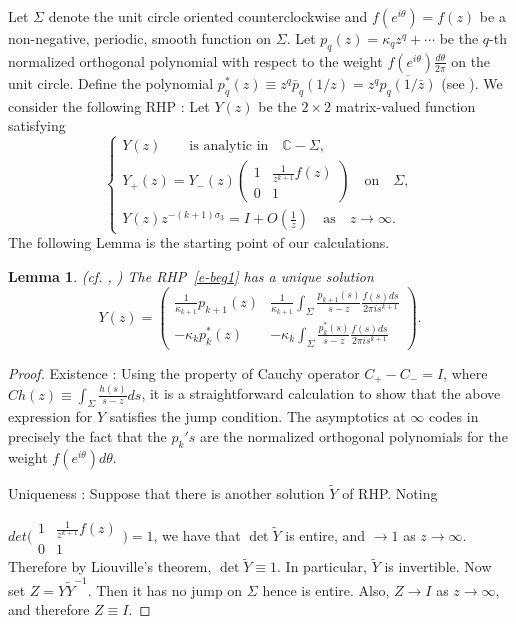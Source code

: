 \documentclass{amsart}
\newtheorem{lem}[thm]{Lemma}
\theoremstyle{definition}
\theoremstyle{remark}
\numberwithin{equation}{section}
\newcommand{\C}{\mathbb C}
\begin{document}
\bigskip
Let $\Sigma$ denote the unit circle oriented counterclockwise 
and $f(e^{i\theta})=f(z)$ be a non-negative, periodic, smooth  
function on $\Sigma$.
Let $p_q(z)=\kappa_qz^q+\cdots$ be the $q$-th normalized orthogonal 
polynomial with respect to the weight 
$f(e^{i\theta})\frac{d\theta}{2\pi}$ on the unit circle.
Define the polynomial $p_q^{*}(z)\equiv z^q\bar{p}_q(1/z)
=z^q\overline{p_q(1/\bar{z})}$ (see \cite{Sz}).
We consider the following RHP : 
Let $Y(z)$ be the $2\times 2$ matrix-valued function satisfying 
\begin{equation}\label{e-beg1}
  \begin{cases}
    Y(z) \qquad  \text{is analytic in} \quad  \C -\Sigma,\\
    Y_+(z)=Y_-(z)\begin{pmatrix}1&\frac{1}{z^{k+1}}f(z)\\0&1
\end{pmatrix} \quad\text{on} \quad  \Sigma,\\
    Y(z)z^{-(k+1)\sigma_3}=I+O(\frac1z) \quad\text{as} \quad z\rightarrow \infty.
  \end{cases}
\end{equation}
The following Lemma is the starting point of our calculations.
\begin{lem}\label{lem-exi}
  (cf. \cite{FIK}, \cite{DKMVZ}) The RHP~\eqref{e-beg1} has a unique solution
  \begin{equation*}
    Y(z)=\begin{pmatrix}
    \frac1{\kappa_{k+1}}p_{k+1}(z)& \frac1{\kappa_{k+1}}
\int_{\Sigma}\frac{p_{k+1}(s)}{s-z}\frac{f(s)ds}{2\pi i s^{k+1}}\\
    -\kappa_{k}p^{*}_{k}(z)& -\kappa_{k}
\int_{\Sigma}\frac{p^{*}_{k}(s)}{s-z}\frac{f(s)ds}{2\pi i s^{k+1}}
       \end{pmatrix}.
  \end{equation*}
\end{lem}
\begin{proof}
  Existence : Using the property of Cauchy operator $C_+-C_-=I$, where
$Ch(z)\equiv\int_{\Sigma} \frac{h(s)}{s-z} ds$,
it is a straightforward calculation
to show that the above expression for $Y$ satisfies the jump condition.
The asymptotics at $\infty$ codes in precisely the fact that the $p_k's$ 
are the normalized orthogonal polynomials for the weight 
$f(e^{i\theta})d\theta$. 

  Uniqueness : Suppose that there is another solution $\tilde{Y}$ of RHP. Noting

$det \biggl( \begin{smallmatrix} 1&\frac{1}{z^{k+1}}f(z)\\0&1
\end{smallmatrix} \biggr) =1$, we have that $\det \tilde{Y}$ is entire, 
and $\to 1$
as $z\to\infty$. Therefore by Liouville's theorem, $\det \tilde{Y}\equiv 1$.
In particular, $\tilde{Y}$ is invertible.
Now set $Z=Y\tilde{Y}^{-1}$. Then it has no jump on $\Sigma$ 
hence is entire. 
Also, $Z\to I$ as $z\to\infty$, and therefore $Z\equiv I$.
\end{proof}
\end{document}
